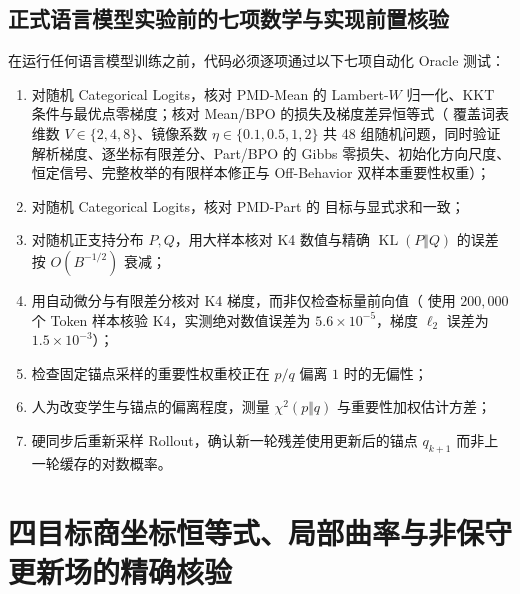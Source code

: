 \documentclass[lang=cn,scheme=chinese,openany]{elegantbook}
\newcommand{\KL}{\operatorname{KL}}
\begin{document}
\subsection{正式语言模型实验前的七项数学与实现前置核验}

在运行任何语言模型训练之前，代码必须逐项通过以下七项自动化 Oracle 测试：
\begin{enumerate}
\item 对随机 Categorical Logits，核对 PMD-Mean 的 Lambert-$W$ 归一化、KKT 条件与最优点零梯度；核对 Mean/BPO 的损失及梯度差异恒等式（ 覆盖词表维数 $V\in\{2,4,8\}$、镜像系数 $\eta\in\{0.1,0.5,1,2\}$ 共 48 组随机问题，同时验证解析梯度、逐坐标有限差分、Part/BPO 的 Gibbs 零损失、初始化方向尺度、恒定信号、完整枚举的有限样本修正与 Off-Behavior 双样本重要性权重）；
\item 对随机 Categorical Logits，核对 PMD-Part 的  目标与显式求和一致；
\item 对随机正支持分布 $P,Q$，用大样本核对 K4 数值与精确 $\KL(P\Vert Q)$ 的误差按 $O(B^{-1/2})$ 衰减；
\item 用自动微分与有限差分核对 K4 梯度，而非仅检查标量前向值（ 使用 $200{,}000$ 个 Token 样本核验 K4，实测绝对数值误差为 $5.6\times 10^{-5}$，梯度 $\ell_2$ 误差为 $1.5\times 10^{-3}$）；
\item 检查固定锚点采样的重要性权重校正在 $p/q$ 偏离 $1$ 时的无偏性；
\item 人为改变学生与锚点的偏离程度，测量 $\chi^2(p\Vert q)$ 与重要性加权估计方差；
\item 硬同步后重新采样 Rollout，确认新一轮残差使用更新后的锚点 $q_{k+1}$ 而非上一轮缓存的对数概率。
\end{enumerate}

\section{四目标商坐标恒等式、局部曲率与非保守更新场的精确核验}
\label{evidence:reconstruction}
\end{document}
